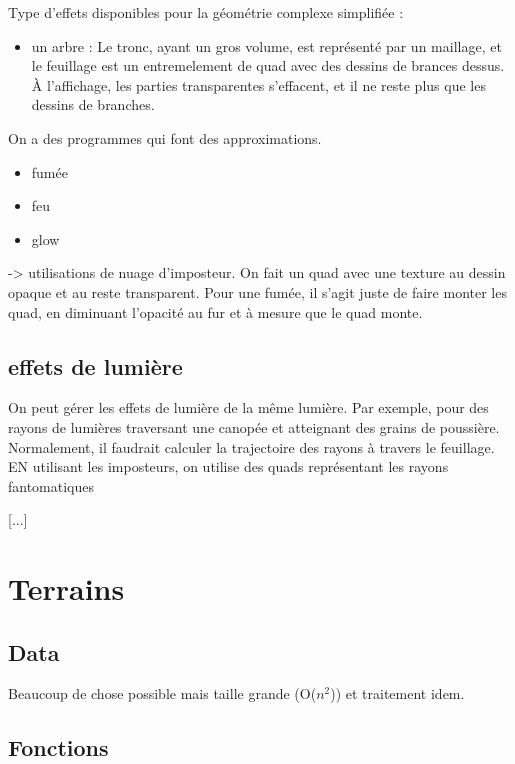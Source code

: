 \documentclass[11pt]{article}
\begin{document}
{Type d'effets disponibles pour la géométrie complexe simplifiée :\\
\begin{itemize}
	\item un arbre : Le tronc, ayant un gros volume, est représenté par un maillage, et le feuillage est un entremelement de quad avec des dessins de brances dessus. À l'affichage, les parties transparentes s'effacent, et il ne reste plus que les dessins de branches.
\end{itemize}

On a des programmes qui font des approximations.

\begin{itemize}
	\item fumée
	\item feu
	\item glow
\end{itemize}
-> utilisations de nuage d'imposteur. On fait un quad avec une texture au dessin opaque et au reste transparent. Pour une fumée, il s'agit juste de faire monter les quad, en diminuant l'opacité au fur et à mesure que le quad monte.

\subsection{effets de lumière}
On peut gérer les effets de lumière de la même lumière. Par exemple, pour des rayons de lumières traversant une canopée et atteignant des grains de poussière. Normalement, il faudrait calculer la trajectoire des rayons à travers le feuillage. EN utilisant les imposteurs, on utilise des quads représentant les rayons fantomatiques

[...]

\section{Terrains}
\subsection{Data}
Beaucoup de chose possible mais taille grande (O($n^2$)) et traitement idem.
\subsection{Fonctions}

}
\end{document}
